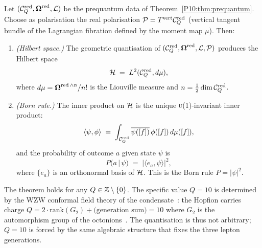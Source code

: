 \begin{theorem}
\label{P10:thm:quantisation}
Let $(\mathcal{C}_Q^{\mathrm{red}},\boldsymbol{\Omega}^{\mathrm{red}},\mathcal{L})$ be the
prequantum data of Theorem~\ref{P10:thm:prequantum}.
Choose as polarisation the real polarisation
$\mathcal{P} = T^{\mathrm{vert}}\mathcal{C}_Q^{\mathrm{red}}$ (vertical tangent bundle
of the Lagrangian fibration defined by the moment map $\mu$).
Then:

\begin{enumerate}[label=\emph{(\roman*)}]
  \item \emph{(Hilbert space.)}
    The geometric quantisation of $(\mathcal{C}_Q^{\mathrm{red}},\boldsymbol{\Omega}^{\mathrm{red}},
    \mathcal{L},\mathcal{P})$ produces the Hilbert space
    \begin{equation}
      \mathcal{H} \;=\; L^2(\mathcal{C}_Q^{\mathrm{red}},d\mu),
      \label{P10:eq:Hilbert}
    \end{equation}
    where $d\mu = \boldsymbol{\Omega}^{\mathrm{red}\,\wedge n}/n!$
    is the Liouville measure and $n = \tfrac{1}{2}\dim\mathcal{C}_Q^{\mathrm{red}}$.

  \item \emph{(Born rule.)}
    The inner product on $\mathcal{H}$ is the unique \textsc{u}(1)-invariant
    inner product:
    \begin{equation}
      \langle\psi,\phi\rangle
      \;=\; \int_{\mathcal{C}_Q^{\mathrm{red}}} \overline{\psi([f])}\,\phi([f])\,d\mu([f]),
      \label{P10:eq:inner_product}
    \end{equation}
    and the probability of outcome $a$ given state $\psi$ is
    \begin{equation}
      P(a\,|\,\psi) \;=\; |\langle e_a,\psi\rangle|^2,
      \label{P10:eq:born}
    \end{equation}
    where $\{e_a\}$ is an orthonormal basis of $\mathcal{H}$.
    This is the Born rule $P=|\psi|^2$.
\end{enumerate}
\end{theorem}

\begin{remark}[Why $Q=10$ and not another integer]
\label{P10:rem:why_Q10}
The theorem holds for any $Q\in\mathbb{Z}\setminus\{0\}$.
The specific value $Q=10$ is determined by the WZW conformal
field theory of the condensate~\cite{Paper1}: the Hopfion carries
charge $Q = 2\cdot\text{rank}(G_2) + \text{(generation sum)} = 10$
where $G_2$ is the automorphism group of the octonions~\cite{Paper9}.
The quantisation is thus not arbitrary; $Q=10$ is forced by the
same algebraic structure that fixes the three lepton generations.
\end{remark}

